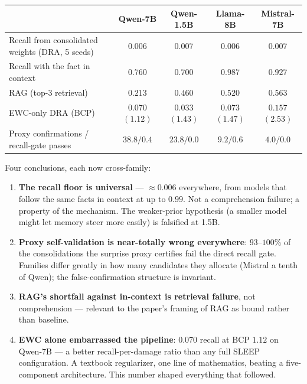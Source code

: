 \documentclass[11pt]{article}
\begin{document}
\begin{center}
\small
\begin{tabular}{@{}l c c c c@{}}
\toprule
 & Qwen-7B & Qwen-1.5B & Llama-8B & Mistral-7B \\
\midrule
Recall from consolidated weights (DRA, 5 seeds) & $0.006$ & $0.007$ & $0.006$ & $0.007$ \\
Recall with the fact in context                 & $0.760$ & $0.700$ & $0.987$ & $0.927$ \\
RAG (top-3 retrieval)                           & $0.213$ & $0.460$ & $0.520$ & $0.563$ \\
EWC-only DRA (BCP)                              & $0.070$ $(1.12)$ & $0.033$ $(1.43)$ & $0.073$ $(1.47)$ & $0.157$ $(2.53)$ \\
Proxy confirmations / recall-gate passes        & $38.8/0.4$ & $23.8/0.0$ & $9.2/0.6$ & $4.0/0.0$ \\
\bottomrule
\end{tabular}
\end{center}

Four conclusions, each now cross-family:

\begin{enumerate}
\item \textbf{The recall floor is universal} --- $\approx 0.006$ everywhere, from models that
      follow the same facts in context at up to $0.99$. Not a comprehension failure; a property of
      the mechanism. The weaker-prior hypothesis (a smaller model might let memory steer more
      easily) is falsified at 1.5B.
\item \textbf{Proxy self-validation is near-totally wrong everywhere}: $93$--$100\%$ of the
      consolidations the surprise proxy certifies fail the direct recall gate. Families differ
      greatly in how many candidates they allocate (Mistral a tenth of Qwen); the
      false-confirmation structure is invariant.
\item \textbf{RAG's shortfall against in-context is retrieval failure}, not comprehension ---
      relevant to the paper's framing of RAG as bound rather than baseline.
\item \textbf{EWC alone embarrassed the pipeline}: $0.070$ recall at BCP $1.12$ on Qwen-7B --- a
      better recall-per-damage ratio than any full SLEEP configuration. A textbook regularizer,
      one line of mathematics, beating a five-component architecture. This number shaped
      everything that followed.
\end{enumerate}
\end{document}
